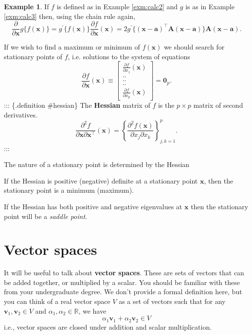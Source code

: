 \documentclass[
]{book}
\theoremstyle{definition}
\theoremstyle{definition}
\newtheorem{example}{Example}[chapter]
\theoremstyle{definition}
\theoremstyle{definition}
\theoremstyle{remark}
\begin{document}
\begin{example}
\protect\hypertarget{exm:calc4}{}\label{exm:calc4}If \(f\) is defined as in Example \ref{exm:calc2} and \(g\) is as in Example \ref{exm:calc3} then, using the chain rule again,
\[
\frac{\partial }{\partial \mathbf x} g\{f(\mathbf x)\}=g^{\prime} \{f(\mathbf x)\}\frac{\partial f}{\partial \mathbf x}(\mathbf x)
=2 g^{\prime}\{(\mathbf x- \mathbf a)^\top \mathbf A(\mathbf x- \mathbf a)\}\mathbf A(\mathbf x-\mathbf a).
\]
\end{example}

If we wish to find a maximum or minimum of \(f(\mathbf x)\) we should search for stationary points of \(f\), i.e.
solutions to the system of equations
\[
\frac{\partial f}{\partial \mathbf x}(\mathbf x)\equiv \left [ \begin{array}{c} \frac{\partial f}{\partial x_1}(\mathbf x)\\
 ..\\
 ..\\
 ..\\
 \frac{\partial f}{\partial x_p}(\mathbf x)
\end{array} \right ]={\mathbf 0}_p.
\]
::: \{.definition \#hessian\}
The \textbf{Hessian} matrix of \(f\) is the \(p \times p\) matrix of second derivatives.
\[
\frac{\partial^2f}{\partial \mathbf x\partial \mathbf x^\top}(\mathbf x) =\left \{ \frac{\partial^2 f(\mathbf x)}{\partial x_j \partial x_k}\right \}_{j,k=1}^p.
\]
:::

The nature of a stationary point is determined by the Hessian

If the Hessian is positive (negative) definite at a stationary point \(\mathbf x\), then the stationary point is a minimum (maximum).

If the Hessian has both positive and negative eigenvalues at \(\mathbf x\) then the stationary point will be a \emph{saddle point}.

\hypertarget{linalg-vecspaces}{%
\section{Vector spaces}\label{linalg-vecspaces}}

It will be useful to talk about \textbf{vector spaces}. These are sets of vectors that can be added together, or multiplied by a scalar. You should be familiar with these from your undergraduate degree. We don't provide a formal definition here, but you can think of a real vector space \(V\) as a set of vectors such that for any \(\mathbf v_1, \mathbf v_2 \in V\) and \(\alpha_1, \alpha_2 \in \mathbb{R}\), we have
\[\alpha_1 \mathbf v_1 + \alpha_2 \mathbf v_2 \in V\]
i.e., vector spaces are closed under addition and scalar multiplication.
\end{document}
